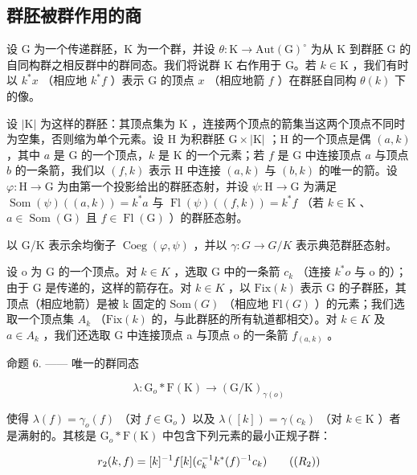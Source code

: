 \subsection{群胚被群作用的商}

设 G 为一个传递群胚，K 为一个群，并设 \(\theta\colon\mathrm{K}\to\mathrm{Aut}(\mathrm{G})^{\circ}\) 为从 K 到群胚 G 的自同构群之相反群中的群同态。我们将说群 K 右作用于 G。若 \(k\in\mathrm{K}\) ，我们有时以 \(k^{*}x\) （相应地 \(k^{*}f\) ）表示 G 的顶点 \(x\) （相应地箭 \(f\) ）在群胚自同构 \(\theta(k)\) 下的像。

设 \(|\mathrm{K}|\) 为这样的群胚：其顶点集为 \(\mathrm{K}\) ，连接两个顶点的箭集当这两个顶点不同时为空集，否则缩为单个元素。设 \(\mathrm{H}\) 为积群胚 \(\mathrm{G} \times |\mathrm{K}|\) ；\(\mathrm{H}\) 的一个顶点是偶 \((a,k)\) ，其中 \(a\) 是 \(\mathrm{G}\) 的一个顶点，\(k\) 是 \(\mathrm{K}\) 的一个元素；若 \(f\) 是 \(\mathrm{G}\) 中连接顶点 \(a\) 与顶点 \(b\) 的一条箭，我们以 \((f,k)\) 表示 \(\mathrm{H}\) 中连接 \((a,k)\) 与 \((b,k)\) 的唯一的箭。设 \(\varphi: \mathrm{H} \to \mathrm{G}\) 为由第一个投影给出的群胚态射，并设 \(\psi: \mathrm{H} \to \mathrm{G}\) 为满足 \(\operatorname{Som}(\psi)((a,k)) = k^*a\) 与 \(\operatorname{Fl}(\psi)((f,k)) = k^*f\) （若 \(k \in \mathrm{K}\) 、\(a \in \operatorname{Som}(\mathrm{G})\) 且 \(f \in \operatorname{Fl}(\mathrm{G})\) ）的群胚态射。

以 G/K 表示余均衡子 \(\operatorname{Coeg}(\varphi,\psi)\) ，并以 \(\gamma\colon G\to G/K\) 表示典范群胚态射。

设 o 为 G 的一个顶点。对 \(k \in K\) ，选取 G 中的一条箭 \(c_{k}\) （连接 \(k^{*}o\) 与 o 的）；由于 G 是传递的，这样的箭存在。对 \(k \in K\) ，以 \(\text{Fix}(k)\) 表示 G 的子群胚，其顶点（相应地箭）是被 k 固定的 \(\text{Som}(G)\) （相应地 \(\text{Fl}(G)\) ）的元素；我们选取一个顶点集 \(A_{k}\) （\(\text{Fix}(k)\) 的，与此群胚的所有轨道都相交）。对 \(k \in K\) 及 \(a \in A_{k}\) ，我们还选取 G 中连接顶点 a 与顶点 o 的一条箭 \(f_{(a,k)}\) 。

命题 6. —— 唯一的群同态

\[
\lambda \colon \mathrm{G} _ {o} * \mathrm{F} (\mathrm{K}) \to (\mathrm{G} / \mathrm{K}) _ {\gamma (o)}
\]

使得 \(\lambda(f) = \gamma_o(f)\) （对 \(f \in \mathrm{G}_o\) ）以及 \(\lambda([k]) = \gamma(c_k)\) （对 \(k \in \mathrm{K}\) ）者是满射的。其核是 \(\mathrm{G}_o * \mathrm{F}(\mathrm{K})\) 中包含下列元素的最小正规子群：

\[
r _ {2} (k, f) = [ k ] ^ {- 1} f [ k ] (c _ {k} ^ {- 1} k ^ {*} (f) ^ {- 1} c _ {k})\tag{\((R_{2})\)}
\]

